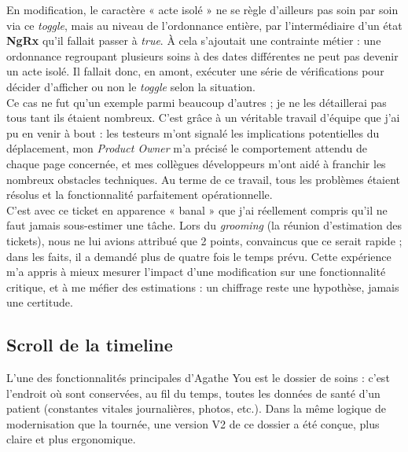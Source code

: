 \documentclass{article}
\begin{document}
En modification, le caractère « acte isolé » ne se règle d'ailleurs pas soin par soin via ce \textit{toggle}, mais au niveau de l'ordonnance entière, par l'intermédiaire d'un état \textbf{NgRx} qu'il fallait passer à \textit{true}. À cela s'ajoutait une contrainte métier : une ordonnance regroupant plusieurs soins à des dates différentes ne peut pas devenir un acte isolé. Il fallait donc, en amont, exécuter une série de vérifications pour décider d'afficher ou non le \textit{toggle} selon la situation.\\

Ce cas ne fut qu'un exemple parmi beaucoup d'autres ; je ne les détaillerai pas tous tant ils étaient nombreux. C'est grâce à un véritable travail d'équipe que j'ai pu en venir à bout : les testeurs m'ont signalé les implications potentielles du déplacement, mon \textit{Product Owner} m'a précisé le comportement attendu de chaque page concernée, et mes collègues développeurs m'ont aidé à franchir les nombreux obstacles techniques. Au terme de ce travail, tous les problèmes étaient résolus et la fonctionnalité parfaitement opérationnelle.\\

C'est avec ce ticket en apparence « banal » que j'ai réellement compris qu'il ne faut jamais sous-estimer une tâche. Lors du \textit{grooming} (la réunion d'estimation des tickets), nous ne lui avions attribué que 2 points, convaincus que ce serait rapide ; dans les faits, il a demandé plus de quatre fois le temps prévu. Cette expérience m'a appris à mieux mesurer l'impact d'une modification sur une fonctionnalité critique, et à me méfier des estimations : un chiffrage reste une hypothèse, jamais une certitude.

\subsection{Scroll de la timeline}

L'une des fonctionnalités principales d'Agathe You est le dossier de soins : c'est l'endroit où sont conservées, au fil du temps, toutes les données de santé d'un patient (constantes vitales journalières, photos, etc.). Dans la même logique de modernisation que la tournée, une version V2 de ce dossier a été conçue, plus claire et plus ergonomique.\\

\end{document}
